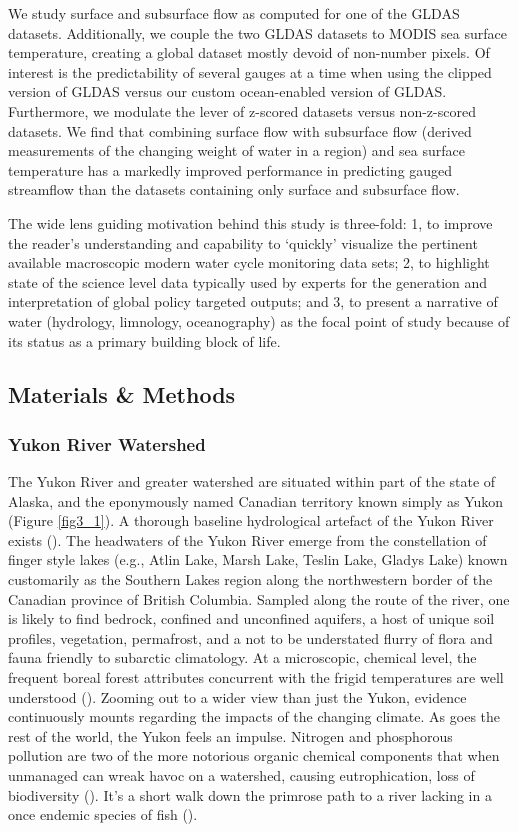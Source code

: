 \begin{refsection}
We study surface and subsurface flow as computed for one of the GLDAS datasets. Additionally, we couple the two GLDAS datasets to MODIS sea surface temperature, creating a global dataset mostly devoid of non-number pixels. Of interest is the predictability of several gauges at a time when using the clipped version of GLDAS versus our custom ocean-enabled version of GLDAS. Furthermore, we modulate the lever of z-scored datasets versus non-z-scored datasets. We find that combining surface flow with subsurface flow (derived measurements of the changing weight of water in a region) and sea surface temperature has a markedly improved performance in predicting gauged streamflow than the datasets containing only surface and subsurface flow.

The wide lens guiding motivation behind this study is three-fold: 1, to improve the reader’s understanding and capability to ‘quickly’ visualize the pertinent available macroscopic modern water cycle monitoring data sets; 2, to highlight state of the science level data typically used by experts for the generation and interpretation of global policy targeted outputs; and 3, to present a narrative of water (hydrology, limnology, oceanography) as the focal point of study because of its status as a primary building block of life. 

\subsection{Materials \& Methods}
\subsubsection{Yukon River Watershed}
The Yukon River and greater watershed are situated within part of the state of Alaska, and the eponymously named Canadian territory known simply as Yukon (Figure \ref{fig3_1}). A thorough baseline hydrological artefact of the Yukon River exists (\cite{brabets2000environmental}). The headwaters of the Yukon River emerge from the constellation of finger style lakes (e.g., Atlin Lake, Marsh Lake, Teslin Lake, Gladys Lake) known customarily as the Southern Lakes region along the northwestern border of the Canadian province of British Columbia. Sampled along the route of the river, one is likely to find bedrock, confined and unconfined aquifers, a host of unique soil profiles, vegetation, permafrost, and a not to be understated flurry of flora and fauna friendly to subarctic climatology. At a microscopic, chemical level, the frequent boreal forest attributes concurrent with the frigid temperatures are well understood (\cite{o2010source}). Zooming out to a wider view than just the Yukon, evidence continuously mounts regarding the impacts of the changing climate. As goes the rest of the world, the Yukon feels an impulse. Nitrogen and phosphorous pollution are two of the more notorious organic chemical components that when unmanaged can wreak havoc on a watershed, causing eutrophication, loss of biodiversity (\cite{carpenter1998nonpoint}). It’s a short walk down the primrose path to a river lacking in a once endemic species of fish (\cite{kanter2020nitrogen}). 


\end{refsection}
